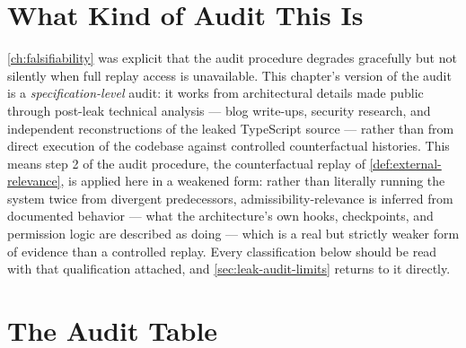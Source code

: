 \documentclass[11pt]{book}
\theoremstyle{plain}
\theoremstyle{definition}
\theoremstyle{remark}
\begin{document}
\section{What Kind of Audit This Is}
\label{sec:audit-caveat}

\cref{ch:falsifiability} was explicit that the audit procedure
degrades gracefully but not silently when full replay access is
unavailable. This chapter's version of the audit is a
\emph{specification-level} audit: it works from architectural details
made public through post-leak technical analysis --- blog write-ups,
security research, and independent reconstructions of the leaked
TypeScript source --- rather than from direct execution of the
codebase against controlled counterfactual histories. This means
step 2 of the audit procedure, the counterfactual replay of
\cref{def:external-relevance}, is applied here in a weakened form:
rather than literally running the system twice from divergent
predecessors, admissibility-relevance is inferred from documented
behavior --- what the architecture's own hooks, checkpoints, and
permission logic are described as doing --- which is a real but
strictly weaker form of evidence than a controlled replay. Every
classification below should be read with that qualification attached,
and \cref{sec:leak-audit-limits} returns to it directly.

\section{The Audit Table}
\end{document}
